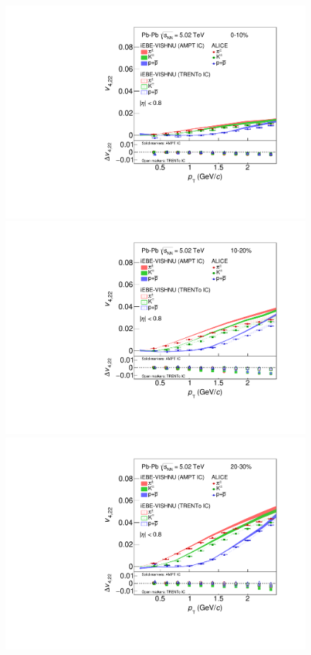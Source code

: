 
 \begin{figure}[!htb]
\begin{center}
\includegraphics[scale=0.26]{figures/model/TrentoAndAMPT_v422_gap00_new_0-10_PID2.pdf}
\includegraphics[scale=0.26]{figures/model/TrentoAndAMPT_v422_gap00_new_10-20_PID2.pdf}
\includegraphics[scale=0.26]{figures/model/TrentoAndAMPT_v422_gap00_new_20-30_PID2.pdf}

\end{center}
\end{figure}
